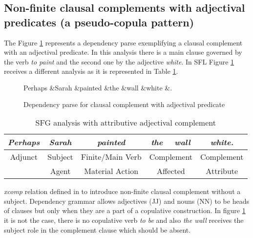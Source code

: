 \subsection{Non-finite clausal complements with adjectival predicates (a pseudo-copula pattern)}
\label{sec:nonfinite-clausal-complement}
The Figure \ref{fig:clausal-complement-jj} represents a dependency parse exemplifying a clausal complement with an adjectival predicate. In this analysis there is a main clause governed by the verb \textit{to paint} and the second one by the adjective \textit{white}. 
In SFL Figure \ref{fig:clausal-complement-jj} receives a different analysis as it is represented in Table \ref{tab:adjectival-complement}.

\begin{figure}[H]
	\centering
	\begin{dependency}
		\begin{deptext}[]
			Perhaps \&Sarah \&painted \&the \&wall \&white \&. \\
		\end{deptext}
	\end{dependency}
	\caption{Dependency parse for clausal complement with adjectival predicate}
	\label{fig:clausal-complement-jj}
\end{figure} 

\begin{table}[H]
	\centering
	\begin{tabular}{|c|c|c|c|c|c|}
		\hline
		\textit{Perhaps} & \textit{Sarah} & \textit{painted} & \textit{the}   & \textit{wall}  & \textit{white.} \\ \hline
		Adjunct          & Subject        & Finite/Main Verb & \multicolumn{2}{c|}{Complement} & Complement      \\ \hline
		& Agent          & Material Action  & \multicolumn{2}{c|}{Affected}   & Attribute       \\ \hline
	\end{tabular}
	\caption{SFG analysis with attributive adjectival complement}
	\label{tab:adjectival-complement}
\end{table}

\textit{xcomp} relation defined in \citep{Marneffe2008} to introduce non-finite clausal complement without a subject. Dependency grammar allows adjectives (JJ) and nouns (NN) to be heads of clauses but only when they are a part of a copulative construction. In figure \ref{fig:clausal-complement-jj} it is not the case, there is no copulative verb \textit{to be} and also \textit{the wall} receives the subject role in the complement clause which should be absent. 

